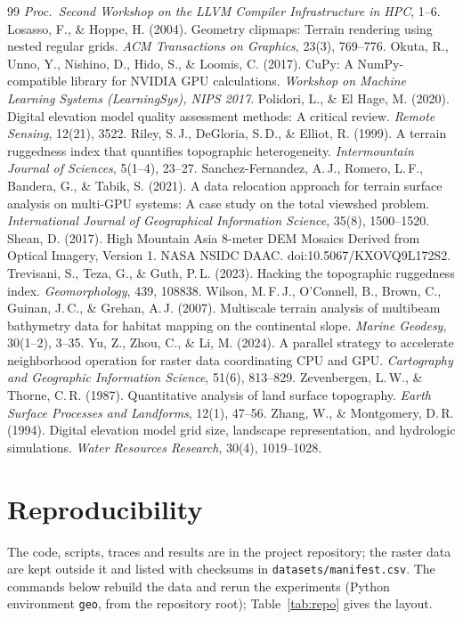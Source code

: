 \documentclass[11pt,a4paper]{article}
\begin{document}
\begin{thebibliography}{99}
\emph{Proc.\ Second Workshop on the LLVM Compiler Infrastructure in HPC}, 1--6.
 Losasso, F., \& Hoppe, H. (2004). Geometry clipmaps: Terrain rendering using nested regular
grids. \emph{ACM Transactions on Graphics}, 23(3), 769--776.
 Okuta, R., Unno, Y., Nishino, D., Hido, S., \& Loomis, C. (2017). CuPy: A NumPy-compatible library
for NVIDIA GPU calculations. \emph{Workshop on Machine Learning Systems (LearningSys), NIPS 2017}.
 Polidori, L., \& El Hage, M. (2020). Digital elevation model quality assessment methods: A
critical review. \emph{Remote Sensing}, 12(21), 3522.
 Riley, S.\,J., DeGloria, S.\,D., \& Elliot, R. (1999). A terrain ruggedness index that quantifies
topographic heterogeneity. \emph{Intermountain Journal of Sciences}, 5(1--4), 23--27.
 Sanchez-Fernandez, A.\,J., Romero, L.\,F., Bandera, G., \& Tabik, S. (2021). A data relocation
approach for terrain surface analysis on multi-GPU systems: A case study on the total viewshed problem.
\emph{International Journal of Geographical Information Science}, 35(8), 1500--1520.
 Shean, D. (2017). High Mountain Asia 8-meter DEM Mosaics Derived from Optical Imagery, Version 1.
NASA NSIDC DAAC. doi:10.5067/KXOVQ9L172S2.
 Trevisani, S., Teza, G., \& Guth, P.\,L. (2023). Hacking the topographic ruggedness index.
\emph{Geomorphology}, 439, 108838.
 Wilson, M.\,F.\,J., O'Connell, B., Brown, C., Guinan, J.\,C., \& Grehan, A.\,J. (2007).
Multiscale terrain analysis of multibeam bathymetry data for habitat mapping on the continental slope.
\emph{Marine Geodesy}, 30(1--2), 3--35.
 Yu, Z., Zhou, C., \& Li, M. (2024). A parallel strategy to accelerate neighborhood operation for
raster data coordinating CPU and GPU. \emph{Cartography and Geographic Information Science}, 51(6), 813--829.
 Zevenbergen, L.\,W., \& Thorne, C.\,R. (1987). Quantitative analysis of land surface topography.
\emph{Earth Surface Processes and Landforms}, 12(1), 47--56.
 Zhang, W., \& Montgomery, D.\,R. (1994). Digital elevation model grid size, landscape
representation, and hydrologic simulations. \emph{Water Resources Research}, 30(4), 1019--1028.
\end{thebibliography}

\appendix
\section{Reproducibility}
The code, scripts, traces and results are in the project repository; the raster data are kept outside it and listed
with checksums in \texttt{datasets/manifest.csv}. The commands below rebuild the data and rerun the experiments (Python environment \texttt{geo}, from the repository root); Table~\ref{tab:repo} gives the layout.
\end{document}
